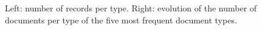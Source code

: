 \documentclass{article}
\begin{document}
\begin{figure}
	\centering
	\caption{Left: number of records per type. Right: evolution of the number of documents per type of the five most frequent document types.}
	\label{fig:doc_types}
\end{figure}
\end{document}
